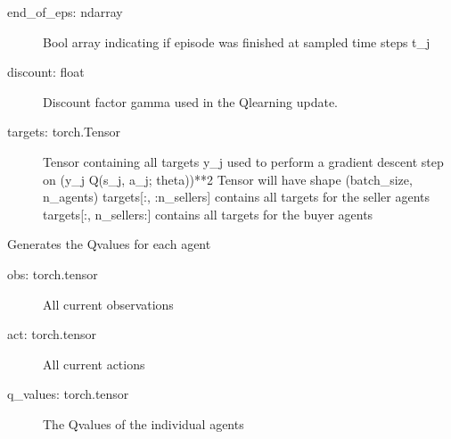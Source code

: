 \documentclass[letterpaper,10pt,english]{sphinxmanual}
\begin{document}
\begin{fulllineitems}
\begin{fulllineitems}
\begin{description}
\item[{end\_of\_eps: ndarray}] \leavevmode
\sphinxAtStartPar
Bool array indicating if episode was finished at sampled time steps t\_j

\item[{discount: float}] \leavevmode
\sphinxAtStartPar
Discount factor gamma used in the Q\sphinxhyphen{}learning update.

\end{description}
\begin{description}
\item[{targets: torch.Tensor}] \leavevmode
\sphinxAtStartPar
Tensor containing all targets y\_j used to perform a gradient descent step on (y\_j \sphinxhyphen{} Q(s\_j, a\_j; theta))**2
Tensor will have shape (batch\_size, n\_agents)
targets{[}:, :n\_sellers{]} contains all targets for the seller agents
targets{[}:, n\_sellers:{]} contains all targets for the buyer agents

\end{description}

\end{fulllineitems}


\begin{fulllineitems}
\label{\detokenize{MultiAgentMarketRL:trainer.DeepQTrainer.generate_Q_values}}
\sphinxAtStartPar
Generates the Q\sphinxhyphen{}values for each agent
\begin{description}
\item[{obs: torch.tensor}] \leavevmode
\sphinxAtStartPar
All current observations

\item[{act: torch.tensor}] \leavevmode
\sphinxAtStartPar
All current actions

\end{description}
\begin{description}
\item[{q\_values: torch.tensor}] \leavevmode
\sphinxAtStartPar
The Q\sphinxhyphen{}values of the individual agents

\end{description}

\end{fulllineitems}


\end{fulllineitems}
\end{document}
